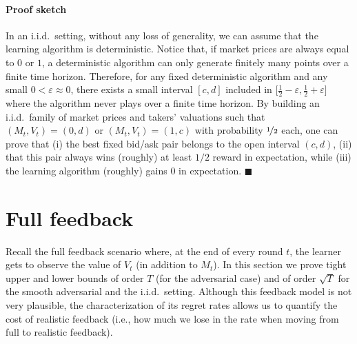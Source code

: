\documentclass[final,12pt]{colt2025}
\newenvironment{proofsketch}{\paragraph{Proof sketch}}{\hfill$\blacksquare$}
\newcommand{\e}{\varepsilon}
\newcommand{\bsb}[1]{\bigl[#1\bigr]}
\newcommand{\nP}{M}
\newcommand{\nZ}{V}
\begin{document}
\begin{proofsketch}%
In an i.i.d.\ setting, without any loss of generality, we can assume that the learning algorithm is deterministic.
Notice that, if market prices are always equal to $0$ or $1$, a deterministic algorithm can only generate finitely many points over a finite time horizon.
Therefore, for any fixed deterministic algorithm and any small $0< \e \approx 0$, there exists a small interval $[c,d]$ included in $\bsb{ \frac12 - \e, \frac12 + \e }$ where the algorithm never plays over a finite time horizon.
By building an i.i.d.\ family of market prices and takers' valuations such that $(\nP_t,\nZ_t) = (0,d)$ or $(\nP_t,\nZ_t) = (1,c)$ with probability $\nicefrac{1}{2}$ each, one can prove that (i) the best fixed bid/ask pair belongs to the open interval $(c,d)$, (ii) that this pair always wins (roughly) at least $1/2$ reward in expectation, while (iii) the learning algorithm (roughly) gains $0$ in expectation.   
\end{proofsketch}










\iffalse
\section{Full feedback}
Recall the full feedback scenario where, at the end of every round $t$, the learner gets to observe the value of $\nZ_t$ (in addition to $\nP_t$). In this section we prove tight upper and lower bounds of order $T$ (for the adversarial case) and of order $\sqrt{T}$ for the smooth adversarial and the i.i.d.\ setting. Although this feedback model is not very plausible, the characterization of its regret rates allows us to quantify the cost of realistic feedback (i.e., how much we lose in the rate when moving from full to realistic feedback).
\end{document}
